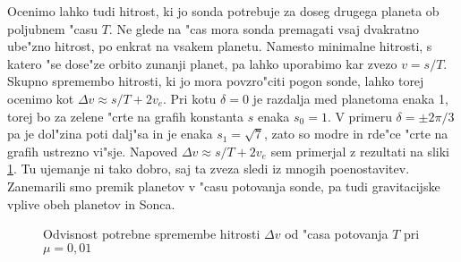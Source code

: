 \documentclass[a4paper,10pt]{article}
\begin{document}
Ocenimo lahko tudi hitrost, ki jo sonda potrebuje za doseg drugega planeta ob poljubnem "casu $T$. Ne glede na "cas mora sonda premagati vsaj dvakratno ube"zno hitrost, po enkrat na vsakem planetu. Namesto minimalne hitrosti, s katero "se dose"ze orbito zunanji planet, pa lahko uporabimo kar zvezo $v = s/T$. Skupno spremembo hitrosti, ki jo mora povzro"citi pogon sonde, lahko torej ocenimo kot $\Delta v \approx s/T + 2v_e$. Pri kotu $\delta=0$ je razdalja med planetoma enaka 1, torej bo za zelene "crte na grafih konstanta $s$ enaka $s_0 = 1$. V primeru $\delta = \pm 2\pi/3$ pa je dol"zina poti dalj"sa in je enaka $s_1=\sqrt{7}$, zato so modre in rde"ce "crte na grafih ustrezno vi"sje. Napoved $\Delta v \approx s/T + 2v_e$ sem primerjal z rezultati na sliki \ref{fig:odvisnost}. Tu ujemanje ni tako dobro, saj ta zveza sledi iz mnogih poenostavitev. Zanemarili smo premik planetov v "casu potovanja sonde, pa tudi gravitacijske vplive obeh planetov in Sonca. 

\begin{figure}[H]
 
 \caption{Odvisnost potrebne spremembe hitrosti $\Delta v$ od "casa potovanja $T$ pri $\mu = 0,\!01$}
 \label{fig:odvisnost}
\end{figure}
\end{document}
